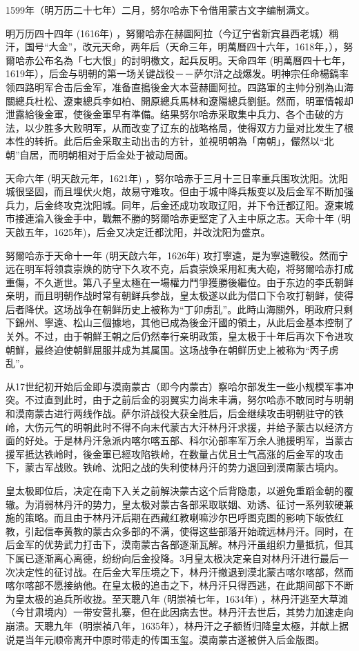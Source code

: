 1599年（明万历二十七年）二月，努尔哈赤下令借用蒙古文字编制满文。

明万历四十四年 (1616年) ，努爾哈赤在赫圖阿拉（今辽宁省新宾县西老城）稱汗，国号“大金”，改元天命，两年后（天命三年，明萬曆四十六年，1618年，），努爾哈赤公布名為「七大恨」的討明檄文，起兵反明。天命四年 (明萬曆四十七年，1619年），后金与明朝的第一场关键战役－－萨尔浒之战爆发。明神宗任命楊鎬率领四路明军合击后金军，准备直搗後金大本营赫圖阿拉。四路軍的主帅分别為山海關總兵杜松、遼東總兵李如柏、開原總兵馬林和遼陽總兵劉鋌。然而，明軍情報却泄露給後金軍，使後金軍早有準備。结果努尔哈赤采取集中兵力、各个击破的方法，以少胜多大败明军，从而改变了辽东的战略格局，使得双方力量对比发生了根本性的转折。此后后金采取主动出击的方针，並視明朝為「南朝」，儼然以“北朝”自居，而明朝相对于后金处于被动局面。

天命六年 (明天啟元年，1621年) ，努尔哈赤于三月十三日率重兵围攻沈阳。沈阳城很坚固，而且埋伏火炮，故易守难攻。但由于城中降兵叛变以及后金军不断加强兵力，后金终攻克沈阳城。同年，后金还成功攻取辽阳，并下令迁都辽阳。遼東城市接連淪入後金手中，戰無不勝的努爾哈赤更堅定了入主中原之志。天命十年 (明天啟五年，1625年)，后金又决定迁都沈阳，并改沈阳为盛京。

努爾哈赤于天命十一年 (明天啟六年，1626年) 攻打寧遠，是为寧遠戰役。然而宁远在明军将领袁崇焕的防守下久攻不克，后袁崇焕采用紅夷大砲，将努爾哈赤打成重傷，不久逝世。第八子皇太極在一場權力鬥爭獲勝後繼位。由于东边的李氏朝鲜亲明，而且明朝作战时常有朝鲜兵参战，皇太极遂以此为借口下令攻打朝鲜，使得后者降伏。这场战争在朝鲜历史上被称为“丁卯虏乱”。此時山海關外，明政府只剩下錦州、寧遠、松山三個據地，其他已成為後金汗國的領土，从此后金基本控制了关外。不过，由于朝鮮王朝之后仍然奉行亲明政策，皇太极于十年后再次下令进攻朝鮮，最终迫使朝鲜屈服并成为其属国。这场战争在朝鲜历史上被称为“丙子虏乱”。

从17世纪初开始后金即与漠南蒙古（即今内蒙古）察哈尔部发生一些小规模军事冲突。不过直到此时，由于之前后金的羽翼实力尚未丰满，努尔哈赤不敢同时与明朝和漠南蒙古进行两线作战。萨尔浒战役大获全胜后，后金继续攻击明朝驻守的铁岭，大伤元气的明朝此时不得不向末代蒙古大汗林丹汗求援，并给予蒙古以经济方面的好处。于是林丹汗急派内喀尔喀五部、科尔沁部率军万余人驰援明军，当蒙古援军抵达铁岭时，後金軍已經攻陷铁岭，在数量占优且士气高涨的后金军的攻击下，蒙古军战败。铁岭、沈阳之战的失利使林丹汗的势力退回到漠南蒙古境内。

皇太极即位后，决定在南下入关之前解決蒙古这个后背隐患，以避免重蹈金朝的覆辙。为消弱林丹汗的势力，皇太极对蒙古各部采取联姻、劝诱、征讨一系列软硬兼施的策略。而且由于林丹汗后期在西藏红教喇嘛沙尔巴呼图克图的影响下皈依红教，引起信奉黄教的蒙古众多部的不满，使得这些部落开始疏远林丹汗。同时，在后金军的优势武力打击下，漠南蒙古各部逐渐瓦解。林丹汗虽组织力量抵抗，但其下属已逐渐离心离德，纷纷向后金投降。3月皇太极决定亲自对林丹汗进行最后一次决定性的征讨战。在后金大军压境之下，林丹汗撤退到漠北蒙古喀尔喀部，然而喀尔喀部不愿接纳他。在皇太极的追击之下，林丹汗只得西逃，在此期间部下不断为皇太极的追兵所收拢。至天聰八年 (明崇禎七年，1634年) ，林丹汗逃至大草滩（今甘肃境内）一带安营扎寨，但在此因病去世。林丹汗去世后，其势力加速走向崩溃。天聰九年（明崇禎八年，1635年），林丹汗之子额哲归降皇太極，并献上据说是当年元顺帝离开中原时带走的传国玉玺。漠南蒙古遂被併入后金版图。


